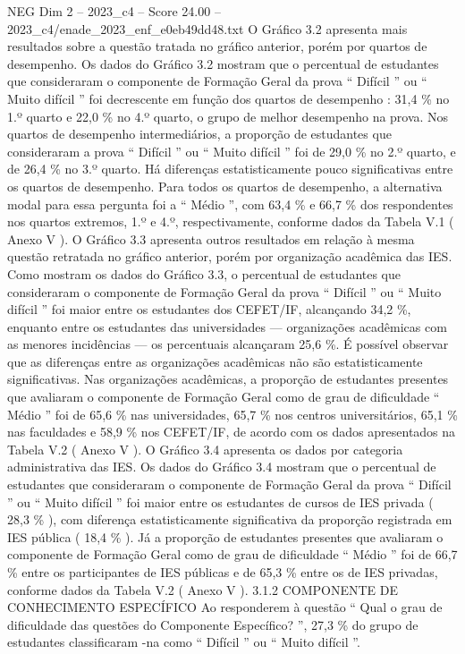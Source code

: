 \begin{textsample}{NEG Dim 2 – 2023\_c4 – Score 24.00 – 2023\_c4/enade\_2023\_enf\_e0eb49dd48.txt}
O Gráfico 3.2 apresenta mais resultados sobre a questão tratada no gráfico anterior, porém por quartos de desempenho.
Os dados do Gráfico 3.2 mostram que o percentual de estudantes que consideraram o componente de Formação Geral da prova “ Difícil ” ou “ Muito difícil ” foi decrescente em função dos quartos de desempenho : 31,4 \% no 1.º quarto e 22,0 \% no 4.º quarto, o grupo de melhor desempenho na prova.
Nos quartos de desempenho intermediários, a proporção de estudantes que consideraram a prova “ Difícil ” ou “ Muito difícil ” foi de 29,0 \% no 2.º quarto, e de 26,4 \% no 3.º quarto.
Há diferenças estatisticamente pouco significativas entre os quartos de desempenho.
Para todos os quartos de desempenho, a alternativa modal para essa pergunta foi a “ Médio ”, com 63,4 \% e 66,7 \% dos respondentes nos quartos extremos, 1.º e 4.º, respectivamente, conforme dados da Tabela V.1 ( Anexo V ).
O Gráfico 3.3 apresenta outros resultados em relação à mesma questão retratada no gráfico anterior, porém por organização acadêmica das IES.
Como mostram os dados do Gráfico 3.3, o percentual de estudantes que consideraram o componente de Formação Geral da prova “ Difícil ” ou “ Muito difícil ” foi maior entre os estudantes dos CEFET/IF, alcançando 34,2 \%, enquanto entre os estudantes das universidades — organizações acadêmicas com as menores incidências — os percentuais alcançaram 25,6 \%.
É possível observar que as diferenças entre as organizações acadêmicas não são estatisticamente significativas.
Nas organizações acadêmicas, a proporção de estudantes presentes que avaliaram o componente de Formação Geral como de grau de dificuldade “ Médio ” foi de 65,6 \% nas universidades, 65,7 \% nos centros universitários, 65,1 \% nas faculdades e 58,9 \% nos CEFET/IF, de acordo com os dados apresentados na Tabela V.2 ( Anexo V ).
O Gráfico 3.4 apresenta os dados por categoria administrativa das IES.
Os dados do Gráfico 3.4 mostram que o percentual de estudantes que consideraram o componente de Formação Geral da prova “ Difícil ” ou “ Muito difícil ” foi maior entre os estudantes de cursos de IES privada ( 28,3 \% ), com diferença estatisticamente significativa da proporção registrada em IES pública ( 18,4 \% ).
Já a proporção de estudantes presentes que avaliaram o componente de Formação Geral como de grau de dificuldade “ Médio ” foi de 66,7 \% entre os participantes de IES públicas e de 65,3 \% entre os de IES privadas, conforme dados da Tabela V.2 ( Anexo V ). 3.1.2 COMPONENTE DE CONHECIMENTO ESPECÍFICO Ao responderem à questão “ Qual o grau de dificuldade das questões do Componente Específico? ”, 27,3 \% do grupo de estudantes classificaram -na como “ Difícil ” ou “ Muito difícil ”.

\end{textsample}

